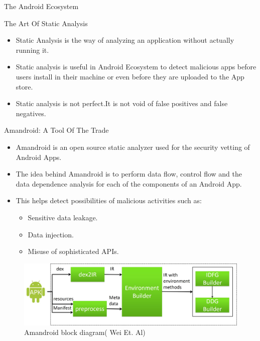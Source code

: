 \documentclass[final,hyperref={pdfpagelabels=false}]{beamer}
\begin{document}
\begin{frame}[t]
\begin{columns}[t]
\begin{column}{.465\textwidth}
\begin{block}{The Android Ecosystem}
\end{block}

            
\begin{block}{The Art Of Static Analysis}

\begin{itemize}
\item Static Analysis is the way of analyzing an application without actually running it. 
\item Static analysis is useful in Android Ecosystem to detect \alert {malicious apps} before users install in their machine or even before they are uploaded to the App store. 
\item Static analysis is not perfect.It is not void of false positives and false negatives. 
\end{itemize}

\end{block}

\begin{block}{Amandroid: A Tool Of The Trade}

\begin{itemize}
\item Amandroid is an open source static analyzer used for the security vetting of Android Apps. 
\item The idea behind Amandroid is to perform data flow, control flow and the data dependence analysis for each of the components of an Android App.
\item This helps detect possibilities of malicious activities such as:  
\begin{itemize}
\item Sensitive data leakage.
\item Data injection. 
\item Misuse of sophisticated APIs.  
\end{itemize}
\end{itemize}

\begin{figure}
\includegraphics[width=0.8\linewidth]{Amandroid.jpg}
\caption{Amandroid block diagram( Wei Et. Al)}
\end{figure}


\end{block}
\end{column}
\end{columns}
\end{frame}
\end{document}
